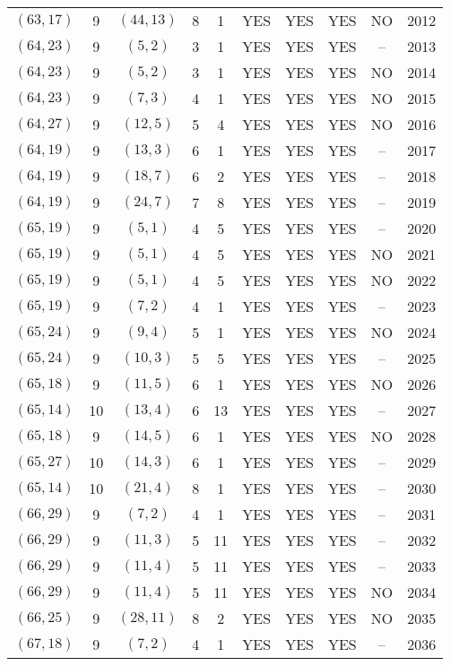 \begin{longtable}{|c|c|c|c|c|c|c|c|c|c|}
$(63, 17)$ & 9 & $(44, 13)$ & 8 & 1 & YES & YES & YES & NO & 2012\\
$(64, 23)$ & 9 & $(5, 2)$ & 3 & 1 & YES & YES & YES & -- & 2013\\
$(64, 23)$ & 9 & $(5, 2)$ & 3 & 1 & YES & YES & YES & NO & 2014\\
$(64, 23)$ & 9 & $(7, 3)$ & 4 & 1 & YES & YES & YES & NO & 2015\\
$(64, 27)$ & 9 & $(12, 5)$ & 5 & 4 & YES & YES & YES & NO & 2016\\
$(64, 19)$ & 9 & $(13, 3)$ & 6 & 1 & YES & YES & YES & -- & 2017\\
$(64, 19)$ & 9 & $(18, 7)$ & 6 & 2 & YES & YES & YES & -- & 2018\\
$(64, 19)$ & 9 & $(24, 7)$ & 7 & 8 & YES & YES & YES & -- & 2019\\
$(65, 19)$ & 9 & $(5, 1)$ & 4 & 5 & YES & YES & YES & -- & 2020\\
$(65, 19)$ & 9 & $(5, 1)$ & 4 & 5 & YES & YES & YES & NO & 2021\\
$(65, 19)$ & 9 & $(5, 1)$ & 4 & 5 & YES & YES & YES & NO & 2022\\
$(65, 19)$ & 9 & $(7, 2)$ & 4 & 1 & YES & YES & YES & -- & 2023\\
$(65, 24)$ & 9 & $(9, 4)$ & 5 & 1 & YES & YES & YES & NO & 2024\\
$(65, 24)$ & 9 & $(10, 3)$ & 5 & 5 & YES & YES & YES & -- & 2025\\
$(65, 18)$ & 9 & $(11, 5)$ & 6 & 1 & YES & YES & YES & NO & 2026\\
$(65, 14)$ & 10 & $(13, 4)$ & 6 & 13 & YES & YES & YES & -- & 2027\\
$(65, 18)$ & 9 & $(14, 5)$ & 6 & 1 & YES & YES & YES & NO & 2028\\
$(65, 27)$ & 10 & $(14, 3)$ & 6 & 1 & YES & YES & YES & -- & 2029\\
$(65, 14)$ & 10 & $(21, 4)$ & 8 & 1 & YES & YES & YES & -- & 2030\\
$(66, 29)$ & 9 & $(7, 2)$ & 4 & 1 & YES & YES & YES & -- & 2031\\
$(66, 29)$ & 9 & $(11, 3)$ & 5 & 11 & YES & YES & YES & -- & 2032\\
$(66, 29)$ & 9 & $(11, 4)$ & 5 & 11 & YES & YES & YES & -- & 2033\\
$(66, 29)$ & 9 & $(11, 4)$ & 5 & 11 & YES & YES & YES & NO & 2034\\
$(66, 25)$ & 9 & $(28, 11)$ & 8 & 2 & YES & YES & YES & NO & 2035\\
$(67, 18)$ & 9 & $(7, 2)$ & 4 & 1 & YES & YES & YES & -- & 2036\\

\end{longtable}
